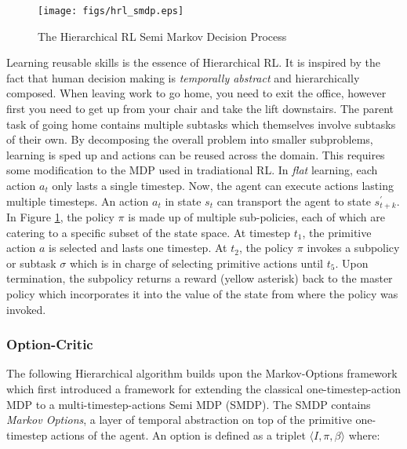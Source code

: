 \documentclass[notitlepage,a4paper,11pt]{article}
\begin{document}
\begin{figure}
	\vspace{-20pt}
	\begin{center}
		\texttt{[image: figs/hrl\_smdp.eps]}
	\end{center}
	\vspace{-20pt}
\caption{The Hierarchical RL Semi Markov Decision Process \protect\cite{ribas2011neural}} \label{fig:hrl_mdp}
\end{figure}

Learning reusable skills is the essence of Hierarchical RL. It is inspired by the fact that human decision making is \textit{temporally abstract} \cite{sutton1999between} and hierarchically composed. When leaving work to go home, you need to exit the office, however first you need to get up from your chair and take the lift downstairs. The parent task of going home contains multiple subtasks which themselves involve subtasks of their own. By decomposing the overall problem into smaller subproblems, learning is sped up and actions can be reused across the domain. This requires some modification to the MDP used in tradiational RL. In \textit{flat} learning, each action $a_t$ only lasts a single timestep. Now, the agent can execute actions lasting multiple timesteps. An action $a_t$ in state $s_t$ can transport the agent to state $s^{\prime}_{t+k}$. In Figure \ref{fig:hrl_mdp}, the policy $\pi$ is made up of multiple sub-policies, each of which are catering to a specific subset of the state space. At timestep $t_1$, the primitive action $a$ is selected and lasts one timestep. At $t_2$, the policy $\pi$ invokes a subpolicy or subtask $\sigma$ which is in charge of selecting primitive actions until $t_5$. Upon termination, the subpolicy returns a reward (yellow asterisk) back to the master policy which incorporates it into the value of the state from where the policy was invoked.

\subsubsection{Option-Critic}
The following Hierarchical algorithm builds upon the Markov-Options framework \cite{sutton1999between} which first introduced a framework for extending the classical one-timestep-action MDP to a multi-timestep-actions Semi MDP (SMDP). The SMDP contains \textit{Markov Options}, a layer of temporal abstraction on top of the primitive one-timestep actions of the agent. An option is defined as a triplet $\langle I, \pi, \beta \rangle$ where:
\end{document}
